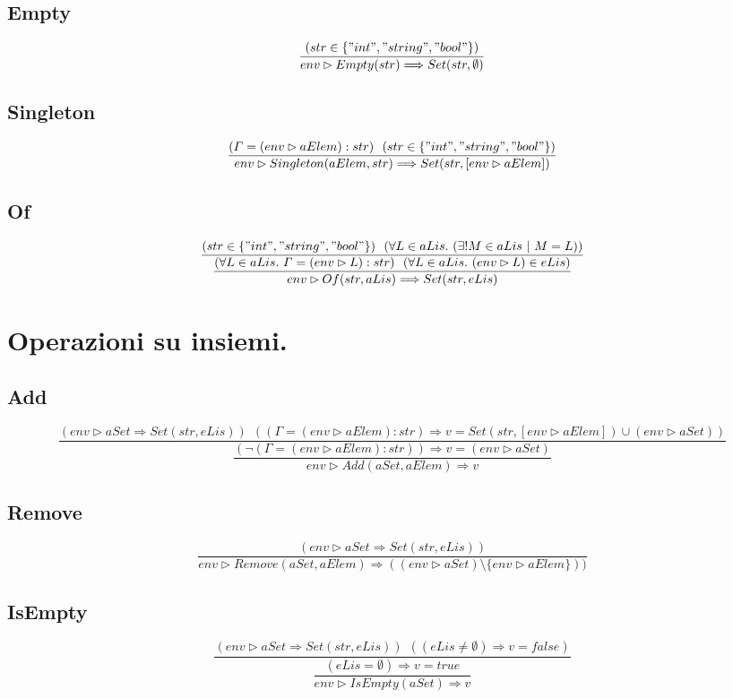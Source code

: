 \documentclass[10pt, italian, openany]{book}
\begin{document}
\section{Empty}

\[
\dfrac
	{ (str \in \{"int", "string", "bool"\}) }
	{env \rhd Empty(str) \Longrightarrow Set(str, \emptyset) }
\]

\section{Singleton}
\[
\dfrac
	{ (\varGamma = (env \rhd aElem): str) \ \ (str \in \{"int", "string", "bool"\}) }
	{env \rhd Singleton(aElem, str) \Longrightarrow Set(str, [env \rhd aElem] )}
\]

\section{Of}
\[
\dfrac
	{ (str \in \{"int", "string", "bool"\}) \ \ (\forall L \in aLis. \ (\exists! M \in aLis \ | \ M = L))}
	{\dfrac
		{(\forall L \in aLis. \ \varGamma = (env \rhd L): str) \ \ (\forall L \in aLis. \ (env \rhd L) \in eLis)}
		{env \rhd Of(str, aLis) \Longrightarrow Set(str, eLis)}
	}
\]


{\let\clearpage\relax \chapter*{Operazioni su insiemi.}}
\section{Add}
\[
\dfrac
	{ (env \rhd aSet \Longrightarrow Set(str, eLis)) \ \ ((\varGamma = (env \rhd aElem): str) \Longrightarrow v = Set(str, [env \rhd aElem]) \cup (env \rhd aSet)) }
	{\dfrac
		{(\neg(\varGamma = (env \rhd aElem): str)) \Longrightarrow v = (env \rhd aSet)}
		{env \rhd Add(aSet, aElem) \Longrightarrow v}
	}
\]

\section{Remove}
\[
\dfrac
	{ (env \rhd aSet \Longrightarrow Set(str, eLis)) }
	{env \rhd Remove(aSet, aElem) \Longrightarrow ((env \rhd aSet) \setminus \{ env \rhd aElem \}) )}
\]

\section{IsEmpty}
\[
\dfrac
	{(env \rhd aSet \Longrightarrow Set(str, eLis)) \ \ ((eLis \neq \emptyset ) \Longrightarrow v = false)}
	{
		\dfrac
		{ (eLis = \emptyset) \Longrightarrow v = true}
		{env \rhd IsEmpty(aSet) \Longrightarrow v}
	}
\]
\end{document}
